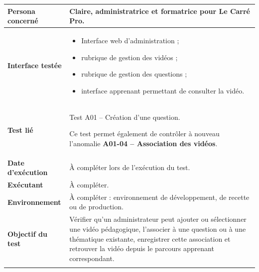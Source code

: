 \begin{longtable}{
    |>{\raggedright\arraybackslash}p{}
    |>{\raggedright\arraybackslash}p{}|
}
\textbf{Persona concerné}
&
Claire, administratrice et formatrice pour Le Carré Pro.
\\
\hline

\textbf{Interface testée}
&
\begin{itemize}[leftmargin=*,nosep]
    \item Interface web d'administration ;
    \item rubrique de gestion des vidéos ;
    \item rubrique de gestion des questions ;
    \item interface apprenant permettant de consulter la vidéo.
\end{itemize}
\\
\hline

\textbf{Test lié}
&
Test A01 -- Création d'une question.

Ce test permet également de contrôler à nouveau l'anomalie
\textbf{A01-04 -- Association des vidéos}.
\\
\hline

\textbf{Date d'exécution}
&
À compléter lors de l'exécution du test.
\\
\hline

\textbf{Exécutant}
&
À compléter.
\\
\hline

\textbf{Environnement}
&
À compléter : environnement de développement, de recette ou de production.
\\
\hline

\textbf{Objectif du test}
&
Vérifier qu'un administrateur peut ajouter ou sélectionner une vidéo
pédagogique, l'associer à une question ou à une thématique existante,
enregistrer cette association et retrouver la vidéo depuis le parcours
apprenant correspondant.
\\
\hline


\rowcolor{orange!50}
\multicolumn{2}{|c|}{
    \textbf{Préconditions}
}
\\
\hline


\end{longtable}
